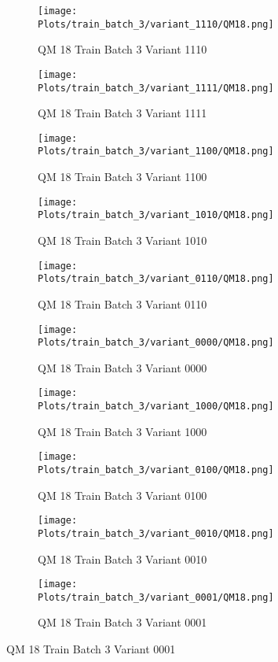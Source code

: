 \documentclass{DissertateFigs}
\begin{document}
\begin{figure}[t!]
    \begin{subfigure}{0.47\textwidth}
    \texttt{[image: Plots/train\_batch\_3/variant\_1110/QM18.png]}
    \caption{QM 18 Train Batch 3 Variant 1110}
    \end{subfigure}
    \begin{subfigure}{0.47\textwidth}
    \texttt{[image: Plots/train\_batch\_3/variant\_1111/QM18.png]}
    \caption{QM 18 Train Batch 3 Variant 1111}
    \end{subfigure}

\medskip

    \begin{subfigure}{0.47\textwidth}
    \texttt{[image: Plots/train\_batch\_3/variant\_1100/QM18.png]}
    \caption{QM 18 Train Batch 3 Variant 1100}
    \end{subfigure}
    \begin{subfigure}{0.47\textwidth}
    \texttt{[image: Plots/train\_batch\_3/variant\_1010/QM18.png]}
    \caption{QM 18 Train Batch 3 Variant 1010}
    \end{subfigure}

\medskip

    \begin{subfigure}{0.47\textwidth}
    \texttt{[image: Plots/train\_batch\_3/variant\_0110/QM18.png]}
    \caption{QM 18 Train Batch 3 Variant 0110}
    \end{subfigure}
    \begin{subfigure}{0.47\textwidth}
    \texttt{[image: Plots/train\_batch\_3/variant\_0000/QM18.png]}
    \caption{QM 18 Train Batch 3 Variant 0000}
    \end{subfigure}

\medskip

    \begin{subfigure}{0.47\textwidth}
    \texttt{[image: Plots/train\_batch\_3/variant\_1000/QM18.png]}
    \caption{QM 18 Train Batch 3 Variant 1000}
    \end{subfigure}
    \begin{subfigure}{0.47\textwidth}
    \texttt{[image: Plots/train\_batch\_3/variant\_0100/QM18.png]}
    \caption{QM 18 Train Batch 3 Variant 0100}
    \end{subfigure}

\medskip

    \begin{subfigure}{0.47\textwidth}
    \texttt{[image: Plots/train\_batch\_3/variant\_0010/QM18.png]}
    \caption{QM 18 Train Batch 3 Variant 0010}
    \end{subfigure}
    \begin{subfigure}{0.47\textwidth}
    \texttt{[image: Plots/train\_batch\_3/variant\_0001/QM18.png]}
    \caption{QM 18 Train Batch 3 Variant 0001}
    \end{subfigure}


\end{figure}
\end{document}
